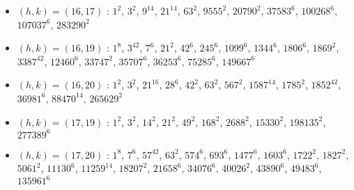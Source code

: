 \begin{itemize}
\item $(h,k)=(16,17)$ : $1^{2}$, $3^{2}$, $9^{14}$, $21^{14}$, $63^{2}$, $9555^{2}$, $20790^{2}$, $37583^{6}$, $100268^{6}$, $107037^{6}$, $283290^{2}$
\item $(h,k)=(16,19)$ : $1^{8}$, $3^{42}$, $7^{6}$, $21^{2}$, $42^{6}$, $245^{6}$, $1099^{6}$, $1344^{6}$, $1806^{6}$, $1869^{2}$, $3387^{42}$, $12460^{6}$, $33747^{2}$, $35707^{6}$, $36253^{6}$, $75285^{6}$, $149667^{6}$
\item $(h,k)=(16,20)$ : $1^{2}$, $3^{2}$, $21^{16}$, $28^{6}$, $42^{2}$, $63^{2}$, $567^{2}$, $1587^{14}$, $1785^{2}$, $1852^{42}$, $36981^{6}$, $88470^{14}$, $265629^{2}$
\item $(h,k)=(17,19)$ : $1^{2}$, $3^{2}$, $14^{2}$, $21^{2}$, $49^{2}$, $168^{2}$, $2688^{2}$, $15330^{2}$, $198135^{2}$, $277389^{6}$
\item $(h,k)=(17,20)$ : $1^{8}$, $7^{6}$, $57^{42}$, $63^{2}$, $574^{6}$, $693^{6}$, $1477^{6}$, $1603^{6}$, $1722^{2}$, $1827^{2}$, $5061^{2}$, $11130^{6}$, $11259^{14}$, $18207^{2}$, $21658^{6}$, $34076^{6}$, $40026^{2}$, $43890^{6}$, $49483^{6}$, $135961^{6}$

\end{itemize}
